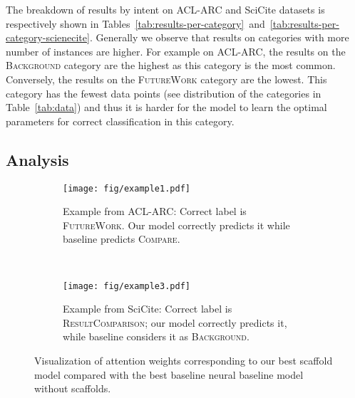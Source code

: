 \documentclass[11pt,a4paper]{article}
\newcommand{\acldata}{ACL-ARC\xspace}
\newcommand{\ourdata}{SciCite\xspace}
\newcommand{\background}{\textsc{Background}\xspace}
\newcommand{\compare}{\textsc{Compare}\xspace}
\newcommand{\future}{\textsc{FutureWork}\xspace}
\newcommand{\result}{\textsc{ResultComparison}\xspace}
\begin{document}
The breakdown of results by intent on \acldata and \ourdata datasets is respectively shown in Tables~\ref{tab:results-per-category}~and~\ref{tab:results-per-category-scienecite}. Generally we observe that results on categories with more number of instances are higher. For example on \acldata, the results on the \background category are the highest as this category is the most common. Conversely, the results on the \future category are the lowest. This category has the fewest data points (see distribution of the categories in Table~\ref{tab:data}) and thus it is harder for the model to learn the optimal parameters for correct classification in this category.


\subsection{Analysis}
\label{subsec:analysis-params}



\begin{figure}[]
\centering
   \begin{subfigure}[b]{\linewidth}
   \texttt{[image: fig/example1.pdf]}
    \caption{\scriptsize{Example from ACL-ARC: Correct label is \future. Our model correctly predicts it while baseline predicts \compare.}}
   \label{fig:Ng1}
    \end{subfigure}
\\
    \begin{subfigure}[b]{\linewidth}
   \texttt{[image: fig/example3.pdf]}
   \caption{\scriptsize{Example from \ourdata: Correct label is \result; our model correctly predicts it, while baseline considers it as \background.}}
   \label{fig:Ng2}
    \end{subfigure}
\caption{
\small{Visualization of attention weights corresponding to our best scaffold model  compared with the best baseline neural baseline model without scaffolds}.
}
\label{fig:examples}
\end{figure}
\end{document}
